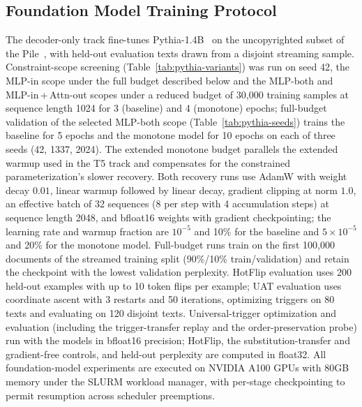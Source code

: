 \documentclass{article}
\theoremstyle{plain}
\theoremstyle{definition}
\theoremstyle{remark}
\begin{document}
\subsection{Foundation Model Training Protocol}
\label{app:pythia}
The decoder-only track fine-tunes Pythia-1.4B~\citep{biderman2023pythia} on the uncopyrighted subset of the Pile~\citep{gao2020pile}, with held-out evaluation texts drawn from a disjoint streaming sample. Constraint-scope screening (Table~\ref{tab:pythia-variants}) was run on seed 42, the MLP-in scope under the full budget described below and the MLP-both and MLP-in\,+\,Attn-out scopes under a reduced budget of 30{,}000 training samples at sequence length 1024 for 3 (baseline) and 4 (monotone) epochs; full-budget validation of the selected MLP-both scope (Table~\ref{tab:pythia-seeds}) trains the baseline for 5 epochs and the monotone model for 10 epochs on each of three seeds (42, 1337, 2024). The extended monotone budget parallels the extended warmup used in the T5 track and compensates for the constrained parameterization's slower recovery. %
Both recovery runs use AdamW with weight decay $0.01$, linear warmup followed by linear decay, gradient clipping at norm $1.0$, an effective batch of 32 sequences (8 per step with 4 accumulation steps) at sequence length 2048, and bfloat16 weights with gradient checkpointing; the learning rate and warmup fraction are $10^{-5}$ and 10\% for the baseline and $5\times 10^{-5}$ and 20\% for the monotone model. Full-budget runs train on the first 100{,}000 documents of the streamed training split (90\%/10\% train/validation) and retain the checkpoint with the lowest validation perplexity. HotFlip evaluation uses 200 held-out examples with up to 10 token flips per example; UAT evaluation uses coordinate ascent with 3 restarts and 50 iterations, optimizing triggers on 80 texts and evaluating on 120 disjoint texts. Universal-trigger optimization and evaluation (including the trigger-transfer replay and the order-preservation probe) run with the models in bfloat16 precision; HotFlip, the substitution-transfer and gradient-free controls, and held-out perplexity are computed in float32. %
All foundation-model experiments are executed on NVIDIA A100 GPUs with 80GB memory under the SLURM workload manager, with per-stage checkpointing to permit resumption across scheduler preemptions.


\end{document}
